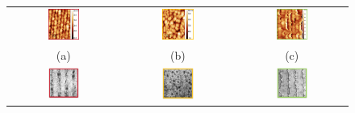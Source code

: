 \begin{figure}[]
\begin{tabular}{ccc}
  \includegraphics[width=0.30\textwidth]{Bilder/TS4048/aSLELOafm.png} & \includegraphics[width=0.30\textwidth]{Bilder/TS4048/bSLELOafm.png}  & \includegraphics[width=0.30\textwidth]{Bilder/TS4048/cSLELOafm.png} \\
(a) & (b) & (c) \\[6pt]
 \includegraphics[width=0.30\textwidth]{Bilder/TS4048/aSLELOcl2.png} &   \includegraphics[width=0.30\textwidth]{Bilder/TS4048/bSLELOcl2.png} & \includegraphics[width=0.30\textwidth]{Bilder/TS4048/cSLELOcl2.png}  \\

\end{tabular}
\end{figure}
